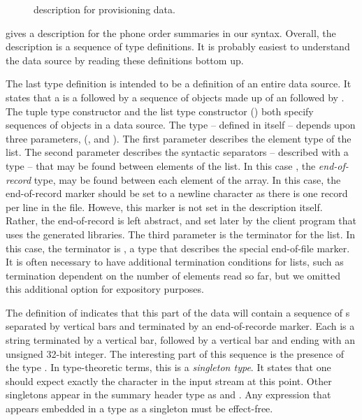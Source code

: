 \suppressfloats

\begin{figure}
  \begin{code}
    
  \end{code}
  \caption{\padsml{} description for \dibbler{} provisioning data.}
  \label{figure:sirius_pml}
\end{figure}


 gives a \padsml{} description for the
\dibbler{} phone order summaries in our syntax.  Overall, the
description is a sequence of type definitions. It is probably easiest
to understand the data source by reading these definitions bottom up.

The last type definition  is intended to be a definition of
an entire \dibbler{} data source.  It states that a  is a
 followed by a sequence of objects made up of an
 followed by .  The tuple type
constructor  and the list type constructor
() both specify sequences of objects in a
data source.  The  type -- defined in \padsml{} itself --
depends upon three parameters, (, and ).
The first parameter describes the element type of the list. The second
parameter describes the syntactic separators -- described with a type
-- that may be found between elements of the list.  In this case
, the {\em end-of-record} type, may be found between each
element of the array.  In this case, the end-of-record marker should
be set to a newline character as there is one record per line in the
file. Howeve, this marker is not set in the description itself.
Rather, the end-of-record is left abstract, and set later by the
client program that uses the generated libraries. The third parameter
is the terminator for the list.  In this case, the terminator is
, a type that describes the special end-of-file marker.  It
is often necessary to have additional termination conditions for
lists, such as termination dependent on the number of elements read so
far, but we omitted this additional option for expository purposes.

The definition of  indicates that this part of the
\dibbler{} data will contain a sequence of s separated by
vertical bars and terminated by an end-of-recorde marker.  Each
 is a string terminated by a vertical bar, followed by a
vertical bar and ending with an unsigned 32-bit integer.  The
interesting part of this sequence is the presence of the type
.  In type-theoretic terms, this is a {\em singleton type}.
It states that one should expect exactly the character  in the
input stream at this point.  Other singletons appear in the summary
header type as  and .  Any expression that appears
embedded in a type as a singleton must be effect-free.

